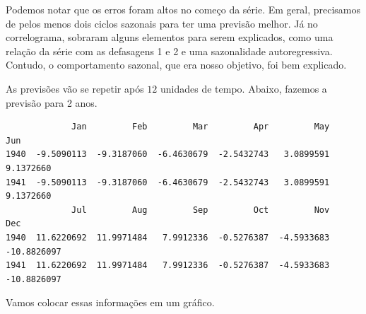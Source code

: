 \documentclass[
  letterpaper,
  DIV=11,
  numbers=noendperiod]{scrreprt}
\newenvironment{Shaded}{\begin{snugshade}}{\end{snugshade}}
\newcommand{\DecValTok}[1]{\textcolor[rgb]{0.68,0.00,0.00}{#1}}
\newcommand{\FunctionTok}[1]{\textcolor[rgb]{0.28,0.35,0.67}{#1}}
\newcommand{\NormalTok}[1]{\textcolor[rgb]{0.00,0.23,0.31}{#1}}
\newcommand{\OtherTok}[1]{\textcolor[rgb]{0.00,0.23,0.31}{#1}}
\newcommand{\SpecialCharTok}[1]{\textcolor[rgb]{0.37,0.37,0.37}{#1}}
\begin{document}
Podemos notar que os erros foram altos no começo da série. Em geral,
precisamos de pelos menos dois ciclos sazonais para ter uma previsão
melhor. Já no correlograma, sobraram alguns elementos para serem
explicados, como uma relação da série com as defasagens 1 e 2 e uma
sazonalidade autoregressiva. Contudo, o comportamento sazonal, que era
nosso objetivo, foi bem explicado.

As previsões vão se repetir após \(12\) unidades de tempo. Abaixo,
fazemos a previsão para 2 anos.

\begin{Shaded}
\end{Shaded}

\begin{verbatim}
             Jan         Feb         Mar         Apr         May         Jun
1940  -9.5090113  -9.3187060  -6.4630679  -2.5432743   3.0899591   9.1372660
1941  -9.5090113  -9.3187060  -6.4630679  -2.5432743   3.0899591   9.1372660
             Jul         Aug         Sep         Oct         Nov         Dec
1940  11.6220692  11.9971484   7.9912336  -0.5276387  -4.5933683 -10.8826097
1941  11.6220692  11.9971484   7.9912336  -0.5276387  -4.5933683 -10.8826097
\end{verbatim}

Vamos colocar essas informações em um gráfico.
\end{document}

